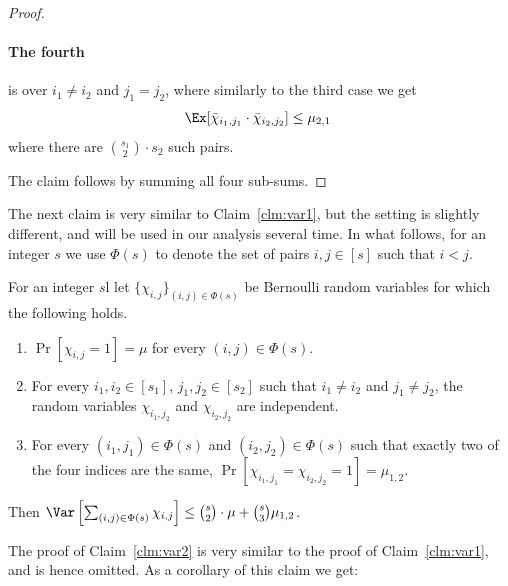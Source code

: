 \begin{proof}
\paragraph{The fourth} is over $i_1 \neq i_2$ and $j_1 = j_2$, where similarly to the third case we get
\begin{equation}\label{eq:cheb-case4}
\Ex[\bar{\chi}_{i_1,j_1}\cdot \bar{\chi}_{i_2,j_2}]  %
\leq %
\mu_{2,1}\;
\end{equation}
where there are ${s_1\choose 2}\cdot s_2$ such pairs.

The claim follows by summing all four sub-sums.
\end{proof}


The next claim is very similar to Claim~\ref{clm:var1}, but the setting is slightly different, and will be used in our analysis several time.
In what follows, for an integer $s$ we use $\Phi(s)$ to denote the set of pairs $i,j\in [s]$ such that $i<j$.
\begin{claim}\label{clm:var2}
For an integer $s$l let $\{\chi_{i,j}\}_{(i,j)\in \Phi(s)}$ be Bernoulli random variables for which the following holds.
\begin{enumerate}
\item  $\Pr[\chi_{i,j} = 1] = \mu$ for every $(i,j)\in \Phi(s)$.
\item For every $i_1,i_2 \in [s_1]$, $j_1,j_2\in [s_2]$ such that $i_1\neq i_2$ and $j_1\neq j_2$,
the random variables $\chi_{i_1,j_2}$ and $\chi_{i_2,j_2}$ are independent.
\item For every $(i_1,j_1)\in \Phi(s)$ and $(i_2,j_2)\in \Phi(s)$  such that exactly two of the four indices are the same,
$\Pr[\chi_{i_1,j_1}=\chi_{i_2,j_2} = 1] = \mu_{1,2}$.
\end{enumerate}
Then $\Var\left[\sum_{(i,j)\in \Phi(s)}\chi_{i,j}\right] \leq {s\choose 2}\cdot \mu + {s\choose 3}\mu_{1,2}$.
\end{claim}
The proof of Claim~\ref{clm:var2} is very similar to the proof of Claim~\ref{clm:var1}, and is hence omitted. As a corollary of this claim we get:

